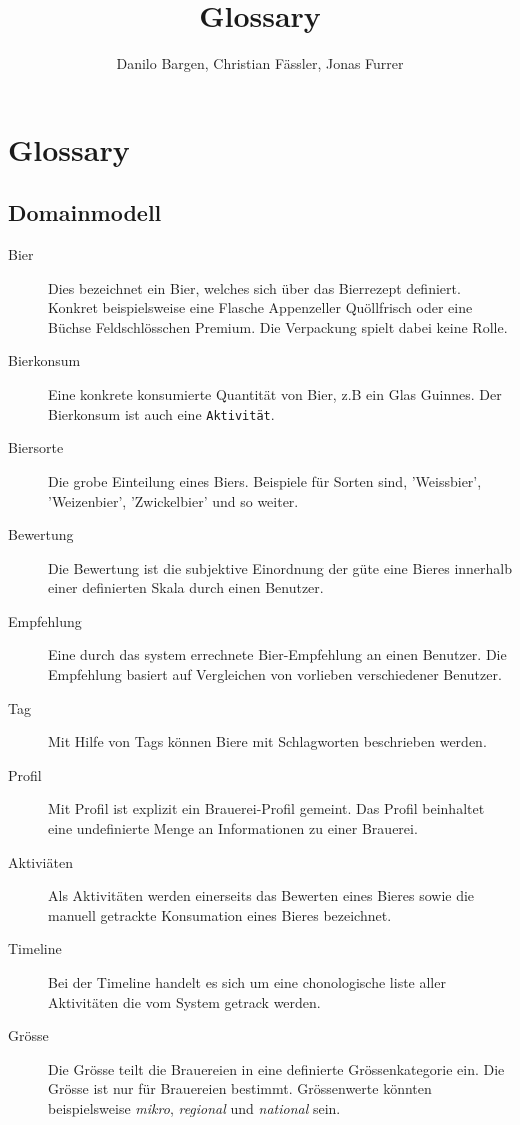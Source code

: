 \documentclass[10pt,a4paper]{scrartcl}
\author{Danilo Bargen, Christian Fässler, Jonas Furrer}
\title{Glossary}
\begin{document}
\begin{titlepage}
	\maketitle
	\vspace{120mm}
	\thispagestyle{empty} %
\end{titlepage}


\section{Glossary}

\subsection{Domainmodell}
\begin{description}
	\item[Bier] Dies bezeichnet ein Bier, welches sich über das Bierrezept definiert. Konkret beispielsweise eine Flasche Appenzeller Quöllfrisch oder eine Büchse Feldschlösschen Premium. Die Verpackung spielt dabei keine Rolle.
	\item[Bierkonsum] Eine konkrete konsumierte Quantität von Bier, z.B ein Glas Guinnes. Der Bierkonsum ist auch eine \texttt{Aktivität}.
	\item[Biersorte] Die grobe Einteilung eines Biers. Beispiele für Sorten sind, 'Weissbier', 'Weizenbier', 'Zwickelbier' und so weiter.
	\item[Bewertung] Die Bewertung ist die subjektive Einordnung der güte eine Bieres innerhalb einer definierten Skala durch einen Benutzer.
	\item[Empfehlung] Eine durch das system errechnete Bier-Empfehlung an einen Benutzer. Die Empfehlung basiert auf Vergleichen von vorlieben verschiedener Benutzer.
	\item[Tag] Mit Hilfe von Tags können Biere mit Schlagworten beschrieben werden.
	\item[Profil] Mit Profil ist explizit ein Brauerei-Profil gemeint. Das Profil beinhaltet eine undefinierte Menge an Informationen zu einer Brauerei.
	\item[Aktiviäten] Als Aktivitäten werden einerseits das Bewerten eines Bieres sowie die manuell getrackte Konsumation eines Bieres bezeichnet. 
	\item[Timeline] Bei der Timeline handelt es sich um eine chonologische liste aller Aktivitäten die vom System getrack werden.
	\item[Grösse] Die Grösse teilt die Brauereien in eine definierte Grössenkategorie ein. Die Grösse ist nur für Brauereien bestimmt. Grössenwerte könnten beispielsweise \textit{mikro}, \textit{regional} und \textit{national} sein.
\end{description}
\end{document}
